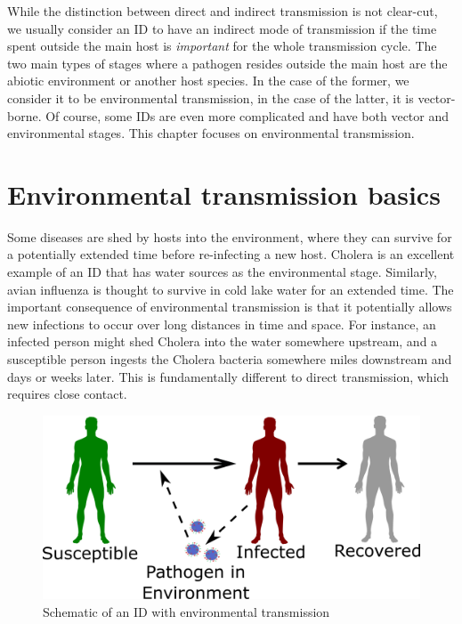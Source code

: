 \documentclass[]{book}
\theoremstyle{definition}
\theoremstyle{definition}
\theoremstyle{definition}
\theoremstyle{remark}
\begin{document}
While the distinction between direct and indirect transmission is not
clear-cut, we usually consider an ID to have an indirect mode of
transmission if the time spent outside the main host is \emph{important}
for the whole transmission cycle. The two main types of stages where a
pathogen resides outside the main host are the abiotic environment or
another host species. In the case of the former, we consider it to be
environmental transmission, in the case of the latter, it is
vector-borne. Of course, some IDs are even more complicated and have
both vector and environmental stages. This chapter focuses on
environmental transmission.

\hypertarget{environmental-transmission-basics}{%
\section{Environmental transmission
basics}\label{environmental-transmission-basics}}

Some diseases are shed by hosts into the environment, where they can
survive for a potentially extended time before re-infecting a new host.
Cholera is an excellent example of an ID that has water sources as the
environmental stage. Similarly, avian influenza is thought to survive in
cold lake water for an extended time. The important consequence of
environmental transmission is that it potentially allows new infections
to occur over long distances in time and space. For instance, an
infected person might shed Cholera into the water somewhere upstream,
and a susceptible person ingests the Cholera bacteria somewhere miles
downstream and days or weeks later. This is fundamentally different to
direct transmission, which requires close contact.

\begin{figure}
\centering
\includegraphics{./images/environmentaltransmissionscheme.png}
\caption{Schematic of an ID with environmental transmission}
\end{figure}
\end{document}
